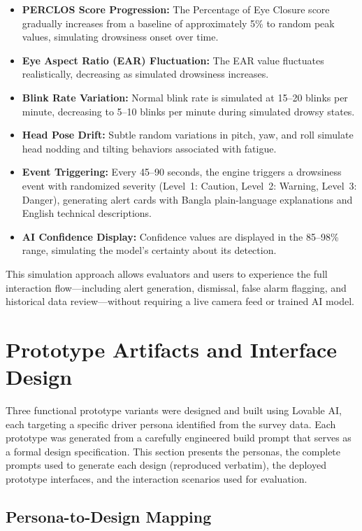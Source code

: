 \documentclass[sigconf]{acmart}
\begin{document}
\begin{itemize}
    \item \textbf{PERCLOS Score Progression:} The Percentage of Eye Closure score gradually increases from a baseline of approximately 5\% to random peak values, simulating drowsiness onset over time.
    \item \textbf{Eye Aspect Ratio (EAR) Fluctuation:} The EAR value fluctuates realistically, decreasing as simulated drowsiness increases.
    \item \textbf{Blink Rate Variation:} Normal blink rate is simulated at 15--20 blinks per minute, decreasing to 5--10 blinks per minute during simulated drowsy states.
    \item \textbf{Head Pose Drift:} Subtle random variations in pitch, yaw, and roll simulate head nodding and tilting behaviors associated with fatigue.
    \item \textbf{Event Triggering:} Every 45--90 seconds, the engine triggers a drowsiness event with randomized severity (Level~1: Caution, Level~2: Warning, Level~3: Danger), generating alert cards with Bangla plain-language explanations and English technical descriptions.
    \item \textbf{AI Confidence Display:} Confidence values are displayed in the 85--98\% range, simulating the model's certainty about its detection.
\end{itemize}

This simulation approach allows evaluators and users to experience the full interaction flow—including alert generation, dismissal, false alarm flagging, and historical data review—without requiring a live camera feed or trained AI model.


\section{Prototype Artifacts and Interface Design}

Three functional prototype variants were designed and built using Lovable AI, each targeting a specific driver persona identified from the survey data. Each prototype was generated from a carefully engineered build prompt that serves as a formal design specification. This section presents the personas, the complete prompts used to generate each design (reproduced verbatim), the deployed prototype interfaces, and the interaction scenarios used for evaluation.

\subsection{Persona-to-Design Mapping}
\end{document}
